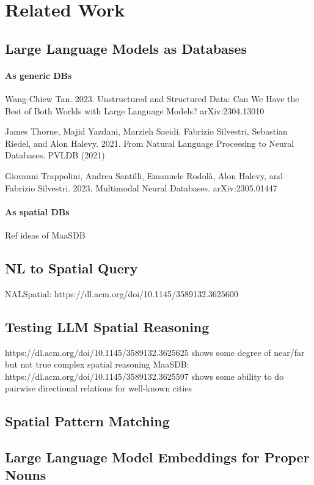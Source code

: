 \section{Related Work}
\label{section:related}
\normalsize


\subsection{Large Language Models as Databases}
    \paragraph{As generic DBs}
        Wang-Chiew Tan. 2023. Unstructured and Structured Data: Can We Have the Best of Both Worlds with Large Language Models? arXiv:2304.13010
        
        James Thorne, Majid Yazdani, Marzieh Saeidi, Fabrizio Silvestri, Sebastian Riedel, and Alon Halevy. 2021. From Natural Language Processing to Neural Databases. PVLDB (2021)
        
        Giovanni Trappolini, Andrea Santilli, Emanuele Rodolà, Alon Halevy, and Fabrizio Silvestri. 2023. Multimodal Neural Databases. arXiv:2305.01447
    \paragraph{As spatial DBs}
        Ref ideas of MaaSDB


\subsection{NL to Spatial Query}
    NALSpatial: https://dl.acm.org/doi/10.1145/3589132.3625600


\subsection{Testing LLM Spatial Reasoning}
    https://dl.acm.org/doi/10.1145/3589132.3625625 shows some degree of near/far but not true complex spatial reasoning
    MaaSDB: https://dl.acm.org/doi/10.1145/3589132.3625597 shows some ability to do pairwise directional relations for well-known cities


\subsection{Spatial Pattern Matching}


\subsection{Large Language Model Embeddings for Proper Nouns}


